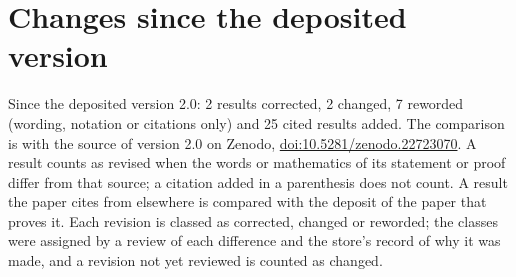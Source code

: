 \documentclass[11pt]{article}
\theoremstyle{definition}
\theoremstyle{plain}
\begin{document}
\section*{Changes since the deposited version}
Since the deposited version 2.0: 2 results corrected, 2 changed, 7 reworded (wording, notation or citations only) and 25 cited results added. The comparison is with the source of version 2.0 on Zenodo, \href{https://doi.org/10.5281/zenodo.22723070}{doi:10.5281/zenodo.22723070}. A result counts as revised when the words or mathematics of its statement or proof differ from that source; a citation added in a parenthesis does not count. A result the paper cites from elsewhere is compared with the deposit of the paper that proves it. Each revision is classed as corrected, changed or reworded; the classes were assigned by a review of each difference and the store's record of why it was made, and a revision not yet reviewed is counted as changed.
\end{document}
